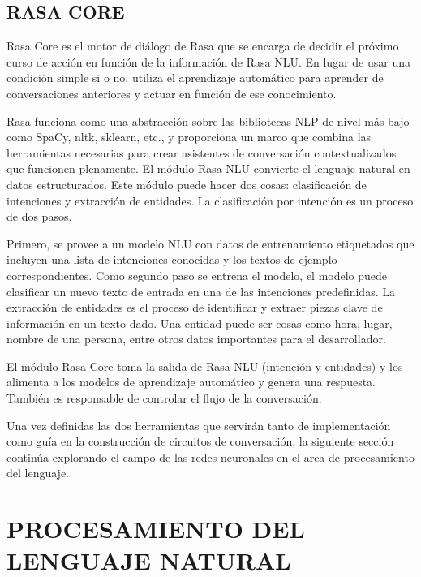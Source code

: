 \documentclass[letter, openright, 12pt]{book}
\begin{document}
\subsection{RASA CORE}
Rasa Core es el motor de diálogo de Rasa que se encarga de decidir el próximo curso de acción en función de la información de Rasa NLU. En lugar de usar una condición simple si o no, utiliza el aprendizaje automático para aprender de conversaciones anteriores y actuar en función de ese conocimiento.
\par
Rasa funciona como una abstracción sobre las bibliotecas NLP de nivel más bajo como SpaCy, nltk, sklearn, etc., y proporciona un marco que combina las herramientas necesarias para crear asistentes de conversación contextualizados que funcionen plenamente. El módulo Rasa NLU convierte el lenguaje natural en datos estructurados. Este módulo puede hacer dos cosas: clasificación de intenciones y extracción de entidades. La clasificación por intención es un proceso de dos pasos. 
\par
Primero, se provee a un modelo NLU con datos de entrenamiento etiquetados que incluyen una lista de intenciones conocidas y los textos de ejemplo correspondientes. Como segundo paso se entrena el modelo, el modelo puede clasificar un nuevo texto de entrada en una de las intenciones predefinidas. La extracción de entidades es el proceso de identificar y extraer piezas clave de información en un texto dado. Una entidad puede ser cosas como hora, lugar, nombre de una persona, entre otros datos importantes para el desarrollador. 
\par 
El módulo Rasa Core toma la salida de Rasa NLU (intención y entidades) y los alimenta a los modelos de aprendizaje automático y genera una respuesta. También es responsable de controlar el flujo de la conversación. 

\par

Una vez definidas las dos herramientas que servirán tanto de implementación como guía en la construcción de circuitos de conversación, la siguiente sección continúa explorando el campo de las redes neuronales en el area de procesamiento del lenguaje. 


\section{PROCESAMIENTO DEL LENGUAJE NATURAL}
\end{document}
